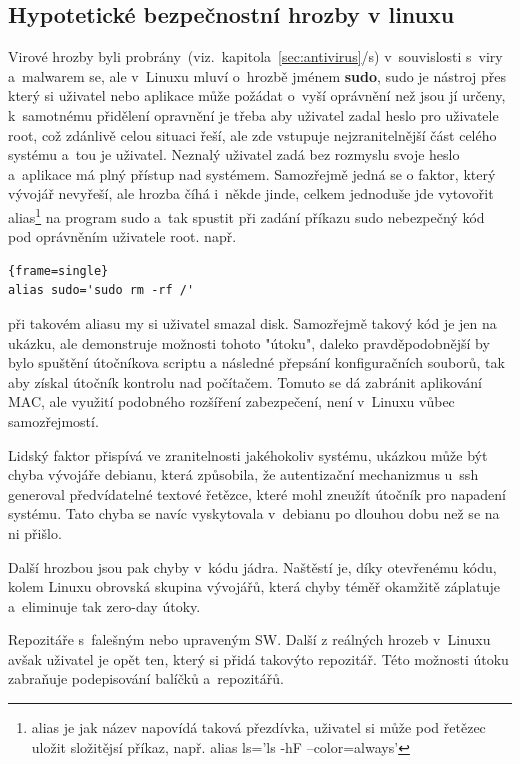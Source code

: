 \documentclass[a4paper,12pt]{article}
\newcommand{\odkazNaKapitolu}[1]{(viz.~kapitola~\ref{#1}/s\pageref{#1})}
\renewcommand{\b}[1]{\textbf{#1}} %
\newenvironment{codeframe}{%
  \begin{Sbox} 
    \begin{minipage} 
      {\columnwidth-\leftmargin-\rightmargin-2\fboxsep-2\fboxrule-4pt} 
}{%

  \end{minipage} 
  \end{Sbox} 
  \begin{center} 
    \fcolorbox{black}{codeback}{\TheSbox} 
  \end{center} 
}
\begin{document}
\subsection{Hypotetické bezpečnostní hrozby v linuxu}
Virové hrozby byli probrány~\odkazNaKapitolu{sec:antivirus} v~souvislosti s~viry a~malwarem se, ale v~Linuxu mluví o~hrozbě jménem \b{sudo}, sudo je nástroj přes který si uživatel nebo aplikace může požádat o~vyší oprávnění než jsou jí určeny, k~samotnému přidělení opravnění je třeba aby uživatel zadal heslo pro uživatele root, což zdánlivě celou situaci řeší, ale zde vstupuje nejzranitelnější část celého systému a~tou je uživatel. Neznalý uživatel zadá bez rozmyslu svoje heslo a~aplikace má plný přístup nad systémem. Samozřejmě jedná se o faktor, který vývojář nevyřeší, ale hrozba číhá i~někde jinde, celkem jednoduše jde vytovořit alias\footnote{alias je jak název napovídá taková přezdívka, uživatel si může pod řetězec uložit složitějsí příkaz, např. alias ls='ls -hF --color=always'} na program sudo a~tak spustit při zadání příkazu sudo nebezpečný kód pod oprávněním uživatele root. např. 
    \begin{codeframe} 
\begin{Verbatim}{frame=single} 
alias sudo='sudo rm -rf /'
\end{Verbatim} 
    \end{codeframe} 
při takovém aliasu my si uživatel smazal disk. Samozřejmě takový kód je jen na ukázku, ale demonstruje možnosti tohoto "útoku", daleko pravděpodobnější by bylo spuštění útočníkova scriptu a následné přepsání konfiguračních souborů, tak aby získal útočník kontrolu nad počítačem. Tomuto se dá zabránit aplikování MAC, ale využití podobného rozšíření zabezpečení, není v~Linuxu vůbec samozřejmostí.

Lidský faktor přispívá ve zranitelnosti jakéhokoliv systému, ukázkou může být chyba vývojáře debianu, která způsobila, že autentizační mechanizmus u~ssh generoval předvídatelné textové řetězce, které mohl zneužít útočník pro napadení systému. Tato chyba se navíc vyskytovala v~debianu po dlouhou dobu než se na ni přišlo.~\cite{DebianSSHFail}

Další hrozbou jsou pak chyby v~kódu jádra. Naštěstí je, díky otevřenému kódu, kolem Linuxu obrovská skupina vývojářů, která chyby téměř okamžitě záplatuje a~eliminuje tak zero-day útoky.

Repozitáře s~falešným nebo upraveným SW. Další z reálných hrozeb v~Linuxu avšak uživatel je opět ten, který si přidá takovýto repozitář. Této možnosti útoku zabraňuje podepisování balíčků a~repozitářů.~\cite{ArchWikiPodepisovaniBalicku}
\end{document}
